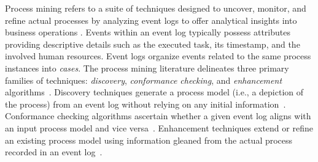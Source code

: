 \begin{newj}



Process mining refers to a suite of techniques designed to uncover, monitor, and refine actual processes by analyzing event logs to offer analytical insights into business operations \cite{van2012process}. Events within an event log typically possess attributes providing descriptive details such as the executed task, its timestamp, and the involved human resources. Event logs organize events related to the same process instances into \emph{cases}. The process mining literature delineates three primary families of techniques: \emph{discovery}, \emph{conformance checking}, and \emph{enhancement} algorithms~\cite{DBLP:journals/tmis/Aalst12}. Discovery techniques generate a process model (i.e., a depiction of the process) from an event log without relying on any initial information~\cite{weijters2006process}. Conformance checking algorithms ascertain whether a given event log aligns with an input process model and vice versa~\cite{vanderAalst2016}. Enhancement techniques extend or refine an existing process model using information gleaned from the actual process recorded in an event log~\cite{DBLP:journals/tmis/Aalst12, DBLP:conf/simpda/YasminBS18}.


\end{newj}
